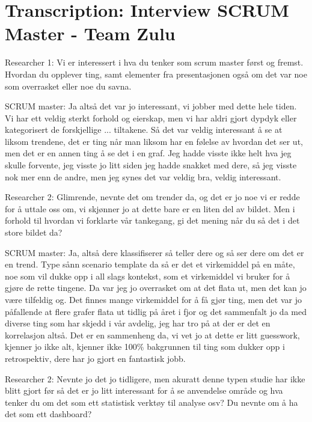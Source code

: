 \documentclass[12pt, a4paper]{report}
\begin{document}
\chapter{Transcription: Interview SCRUM Master - Team Zulu}
Researcher 1: Vi er interessert i hva du tenker som scrum master først og fremst. Hvordan du opplever ting, samt elementer fra presentasjonen også om det var noe som overrasket eller noe du savna.

SCRUM master: Ja altså det var jo interessant, vi jobber med dette hele tiden. Vi har ett veldig sterkt forhold og eierskap, men vi har aldri gjort dypdyk eller kategorisert de forskjellige ... tiltakene. Så det var veldig interessant å se  at liksom trendene, det er ting når man liksom har en følelse av hvordan det ser ut, men det er en annen ting å se det i en graf. Jeg hadde visste ikke helt hva jeg skulle forvente, jeg visste jo litt siden jeg hadde snakket med dere, så jeg visste nok mer enn de andre, men jeg synes det var veldig bra, veldig interessant.

Researcher 2: Glimrende, nevnte det om trender da, og det er jo noe vi er redde for å uttale oss om, vi skjønner jo at dette bare er en liten del av bildet. Men i forhold til hvordan vi forklarte vår tankegang, gi det mening når du så det i det store bildet da?

SCRUM master: Ja, altså dere klassifiserer så teller dere og så ser dere om det er en trend. Type sånn scenario template da så er det et virkemiddel på en måte, noe som vil dukke opp i all slags kontekst, som et virkemiddel vi bruker for å gjøre de rette tingene. Da var jeg jo overrasket om at det flata ut, men det kan jo være tilfeldig og. Det finnes mange virkemiddel for å få gjør ting, men det var jo påfallende at flere grafer flata ut tidlig på året i fjor og det sammenfalt jo da med diverse ting som har skjedd i vår avdelig, jeg har tro på at der er det en korrelasjon altså. Det er en sammenheng da, vi vet jo at dette er litt guesswork, kjenner jo ikke alt, kjenner ikke 100\% bakgrunnen til ting som dukker opp i retrospektiv, dere har jo gjort en fantastisk jobb.

Researcher 2: Nevnte jo det jo tidligere, men akuratt denne typen studie har ikke blitt gjort før så det er jo litt interessant for å se anvendelse område og hva tenker du om det som ett statistisk verktøy til analyse osv? Du nevnte om å ha det som ett dashboard?
\end{document}
